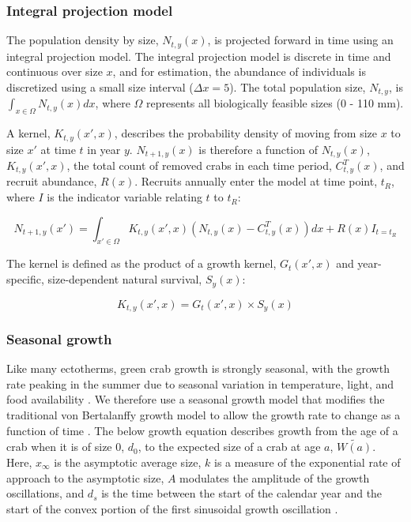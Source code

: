 \documentclass{article}
\begin{document}
\subsubsection*{Integral projection model}

The population density by size, $N_{t, y}(x)$, is projected forward in time using an integral projection model. The integral projection model is discrete in time and continuous over size $x$, and for estimation, the abundance of individuals is discretized using a small size interval ($\Delta x = 5$). The total population size, $N_{t,y}$, is $\int_{x \in \Omega} N_{t, y}(x)dx$, where $\Omega$ represents all biologically feasible sizes (0 - 110 mm).

A kernel, $K_{t,y}(x', x)$, describes the probability density of moving from size $x$ to size $x'$ at time $t$ in year $y$. $N_{t+1,y}(x)$ is therefore a function of $N_{t,y}(x)$, $K_{t,y}(x', x)$, the total count of removed crabs in each time period, $C_{t,y}^T(x)$, and recruit abundance, $R(x)$. Recruits annually enter the model at time point, $t_R$, where $I$ is the indicator variable relating $t$ to $t_R$:

\begin{equation}
N_{t+1,y}(x') = \int_{x' \in \Omega} K_{t,y}(x',x) (N_{t,y}(x) - C_{t,y}^T(x)) dx + R(x)I_{t = t_R}
\end{equation}

The kernel is defined as the product of a growth kernel, $G_t(x',x)$ and year-specific, size-dependent natural survival, $S_y(x)$:

\begin{equation}
K_{t,y}(x',x) = G_t(x',x) \times S_y(x)
\end{equation}

\subsubsection*{Seasonal growth}

Like many ectotherms, green crab growth is strongly seasonal, with the growth rate peaking in the summer due to seasonal variation in temperature, light, and food availability \parencite{contreras2003population, garcia2012technical}. We therefore use a seasonal growth model that modifies the traditional von Bertalanffy growth model to allow the growth rate to change as a function of time \parencite{beverton2012dynamics, somers1988seasonally}. The below growth equation describes growth from the age of a crab when it is of size 0, $d_0$, to the expected size of a crab at age $a$, $\widetilde{W(a)}$. Here, $x_{\infty}$ is the asymptotic average size, $k$ is a measure of the exponential rate of approach to the asymptotic size, $A$ modulates the amplitude of the growth oscillations, and $d_s$ is the time between the start of the calendar year and the start of the convex portion of the first sinusoidal growth oscillation \parencite{garcia2012technical}.
\end{document}
